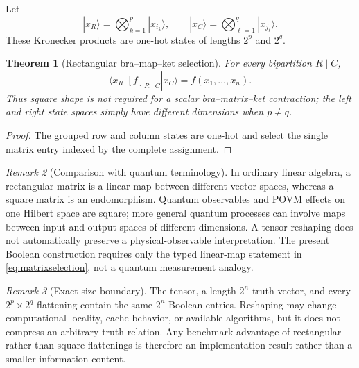 \documentclass[11pt]{article}
\newtheorem{theorem}{Theorem}[section]
\theoremstyle{definition}
\theoremstyle{remark}
\newtheorem{remark}[theorem]{Remark}
\begin{document}
Let
\[
 |x_R\rangle=\bigotimes_{k=1}^p|x_{i_k}\rangle,
 \qquad
 |x_C\rangle=\bigotimes_{\ell=1}^q|x_{j_\ell}\rangle.
\]
These Kronecker products are one-hot states of lengths $2^p$ and $2^q$.
\begin{theorem}[Rectangular bra--map--ket selection]
For every bipartition $R\mid C$,
\begin{equation}
 \langle x_R|[f]_{R\mid C}|x_C\rangle
 =f(x_1,\ldots,x_n).
 \label{eq:matrixselection}
\end{equation}
Thus square shape is not required for a scalar bra--matrix--ket contraction; the left and right state spaces simply have different dimensions when $p\ne q$.
\end{theorem}
\begin{proof}
The grouped row and column states are one-hot and select the single matrix entry indexed by the complete assignment.
\end{proof}

\begin{remark}[Comparison with quantum terminology]
In ordinary linear algebra, a rectangular matrix is a linear map between different vector spaces, whereas a square matrix is an endomorphism.  Quantum observables and POVM effects on one Hilbert space are square; more general quantum processes can involve maps between input and output spaces of different dimensions.  A tensor reshaping does not automatically preserve a physical-observable interpretation.  The present Boolean construction requires only the typed linear-map statement in \eqref{eq:matrixselection}, not a quantum measurement analogy.
\end{remark}

\begin{remark}[Exact size boundary]
The tensor, a length-$2^n$ truth vector, and every $2^p\times2^q$ flattening contain the same $2^n$ Boolean entries.  Reshaping may change computational locality, cache behavior, or available algorithms, but it does not compress an arbitrary truth relation.  Any benchmark advantage of rectangular rather than square flattenings is therefore an implementation result rather than a smaller information content.
\end{remark}
\end{document}
